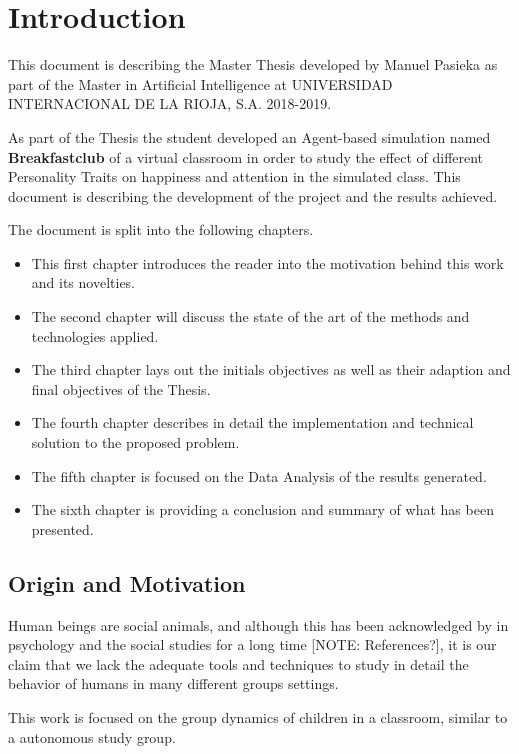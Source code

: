 \chapter{Introduction}
This document is describing the Master Thesis developed by Manuel Pasieka as part
of the Master in Artificial Intelligence at UNIVERSIDAD INTERNACIONAL DE LA RIOJA, S.A.
2018-2019. \par

\bb

As part of the Thesis the student developed an Agent-based simulation named
\textbf{Breakfastclub} of a virtual classroom in order to study the effect of
different Personality Traits on happiness and attention in the simulated class.
This document is describing the development of the project and the results achieved.

\bb

The document is split into the following chapters.
\begin{itemize}
\item This first chapter introduces the reader into the motivation behind this work and
its novelties.
\item The second chapter will discuss the state of the art of the methods and technologies
applied.
\item The third chapter lays out the initials objectives as well as their adaption
and final objectives of the Thesis.
\item The fourth chapter describes in detail the implementation and technical solution
to the proposed problem.
\item The fifth chapter is focused on the Data Analysis of the results generated.
\item The sixth chapter is providing a conclusion and summary of what has been presented.
\end{itemize}

\section{Origin and Motivation}
Human beings are social animals, and although this has been acknowledged by
in psychology and the social studies for a long time [NOTE: References?], it is 
our claim that we lack the adequate tools and techniques to study in detail the
behavior of humans in many different groups settings.

This work is focused on the group dynamics of children in a classroom, similar
to a autonomous study group.


